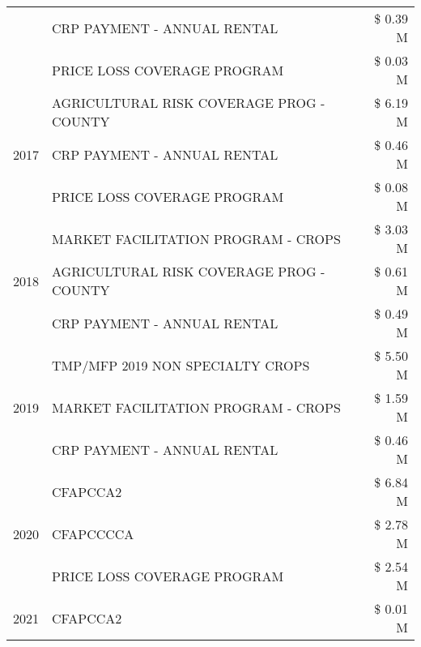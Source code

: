 \begin{tabular}{llr}
 & CRP PAYMENT - ANNUAL RENTAL & \$ 0.39 M \\
 & PRICE LOSS COVERAGE PROGRAM & \$ 0.03 M \\
\cline{1-3}
\multirow[t]{3}{*}{2017} & AGRICULTURAL RISK COVERAGE PROG - COUNTY & \$ 6.19 M \\
 & CRP PAYMENT - ANNUAL RENTAL & \$ 0.46 M \\
 & PRICE LOSS COVERAGE PROGRAM & \$ 0.08 M \\
\cline{1-3}
\multirow[t]{3}{*}{2018} & MARKET FACILITATION PROGRAM - CROPS & \$ 3.03 M \\
 & AGRICULTURAL RISK COVERAGE PROG - COUNTY & \$ 0.61 M \\
 & CRP PAYMENT - ANNUAL RENTAL & \$ 0.49 M \\
\cline{1-3}
\multirow[t]{3}{*}{2019} & TMP/MFP 2019 NON SPECIALTY CROPS & \$ 5.50 M \\
 & MARKET FACILITATION PROGRAM - CROPS & \$ 1.59 M \\
 & CRP PAYMENT - ANNUAL RENTAL & \$ 0.46 M \\
\cline{1-3}
\multirow[t]{3}{*}{2020} & CFAPCCA2 & \$ 6.84 M \\
 & CFAPCCCCA & \$ 2.78 M \\
 & PRICE LOSS COVERAGE PROGRAM & \$ 2.54 M \\
\cline{1-3}
2021 & CFAPCCA2 & \$ 0.01 M \\
\cline{1-3}
\bottomrule
\end{tabular}
